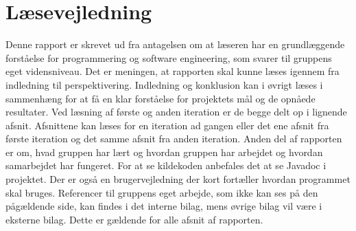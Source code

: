 \chapter{Læsevejledning}
Denne rapport er skrevet ud fra antagelsen om at læseren har en grundlæggende forståelse for programmering og software engineering, som svarer til gruppens eget vidensniveau. 
Det er meningen, at rapporten skal kunne læses igennem fra indledning til perspektivering. 
Indledning og konklusion kan i øvrigt læses i sammenhæng for at få en klar forståelse for projektets mål og de opnåede resultater. 
Ved læsning af første og anden iteration er de begge delt op i lignende afsnit. 
Afsnittene kan læses for en iteration ad gangen eller det ene afsnit fra første iteration og det samme afsnit fra anden iteration. 
Anden del af rapporten er om, 
hvad gruppen har lært og hvordan gruppen har arbejdet og hvordan samarbejdet har fungeret. For at se kildekoden anbefales det at se Javadoc i projektet. 
Der er også en brugervejledning der kort fortæller hvordan programmet skal bruges. 
Referencer til gruppens eget arbejde, som ikke kan ses på den pågældende side, 
kan findes i det interne bilag, 
mens øvrige bilag vil være i eksterne bilag. Dette er gældende for alle afsnit af rapporten.\\
